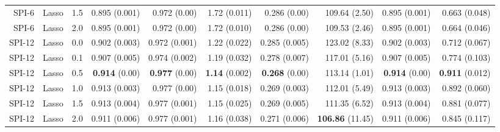 \begin{table}
\begin{tabular}{rrrrrrrrrr}
  SPI-6 &     Lasso &   1.5 &        0.895 (0.001) &        0.972 (0.00) &        1.72 (0.011) &         0.286 (0.00) &         109.64 (2.50) &        0.895 (0.001) &        0.663 (0.048) \\
  SPI-6 &     Lasso &   2.0 &        0.895 (0.001) &        0.972 (0.00) &        1.72 (0.010) &         0.286 (0.00) &         109.53 (2.46) &        0.895 (0.001) &        0.664 (0.046) \\
 SPI-12 &     Lasso &   0.0 &        0.902 (0.003) &       0.972 (0.001) &        1.22 (0.022) &        0.285 (0.005) &         123.02 (8.33) &        0.902 (0.003) &        0.712 (0.067) \\
 SPI-12 &     Lasso &   0.1 &        0.907 (0.005) &       0.974 (0.002) &        1.19 (0.032) &        0.278 (0.007) &         117.01 (5.16) &        0.907 (0.005) &        0.774 (0.103) \\
 SPI-12 &     Lasso &   0.5 &  { \bf 0.914} (0.00) & { \bf 0.977} (0.00) & { \bf 1.14} (0.002) &  { \bf 0.268} (0.00) &         113.14 (1.01) &  { \bf 0.914} (0.00) & { \bf 0.911} (0.012) \\
 SPI-12 &     Lasso &   1.0 &        0.913 (0.003) &        0.977 (0.00) &        1.15 (0.018) &        0.269 (0.003) &         112.01 (5.49) &        0.913 (0.003) &        0.892 (0.060) \\
 SPI-12 &     Lasso &   1.5 &        0.913 (0.004) &       0.977 (0.001) &        1.15 (0.025) &        0.269 (0.005) &         111.35 (6.52) &        0.913 (0.004) &        0.881 (0.077) \\
 SPI-12 &     Lasso &   2.0 &        0.911 (0.006) &       0.977 (0.001) &        1.16 (0.038) &        0.271 (0.006) & { \bf 106.86} (11.45) &        0.911 (0.006) &        0.845 (0.117) \\
\bottomrule
\end{tabular}
\end{table}
